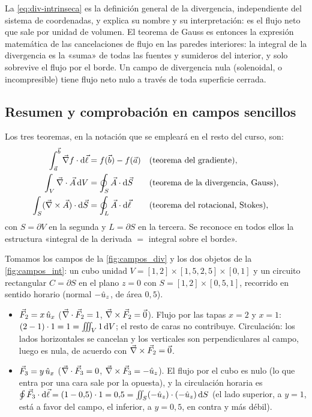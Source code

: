 La \cref{eq:div-intrinseca} es la definición general de la divergencia,
independiente del sistema de coordenadas, y explica su nombre y su
interpretación: es el flujo neto que sale por unidad de volumen. El teorema de
Gauss es entonces la expresión matemática de las cancelaciones de flujo en las
paredes interiores: la integral de la divergencia es la «suma» de todas las
fuentes y sumideros del interior, y solo sobrevive el flujo por el borde. Un
campo de divergencia nula (solenoidal, o incompresible) tiene flujo neto nulo a
través de toda superficie cerrada.



\subsection{Resumen y comprobación en campos sencillos}\label{sec:resumen-teoremas}
Los tres teoremas, en la notación que se empleará en el resto del curso, son:
\begin{align}
  \int_{\vec{a}}^{\vec{b}}\vec{\nabla} f\cdot\mathrm{d}\vec{\ell}&=f(\vec{b})-f(\vec{a}) &&\text{(teorema del gradiente)},\label{eq:resumen-grad}\\
  \int_{V}\vec{\nabla}\cdot\vec{A}\,\mathrm{d} V&=\oint_{S}\vec{A}\cdot\mathrm{d}\vec{S} &&\text{(teorema de la divergencia, Gauss)},\label{eq:resumen-gauss}\\
  \int_{S}(\vec{\nabla}\times\vec{A})\cdot\mathrm{d}\vec{S}&=\oint_{L}\vec{A}\cdot\mathrm{d}\vec{\ell} &&\text{(teorema del rotacional, Stokes)},\label{eq:resumen-stokes}
\end{align}
con $S=\partial V$ en la segunda y $L=\partial S$ en la tercera. Se reconoce en
todos ellos la estructura «integral de la derivada $=$ integral sobre el borde».

\begin{ejemplo}\label{ej:comprobacion-campos}
Tomamos los campos de la \cref{fig:campos_div} y los dos objetos de la
\cref{fig:campos_int}: un cubo unidad $V=[1,2]\times[1{,}5,2{,}5]\times[0,1]$ y un
circuito rectangular $C=\partial S$ en el plano $z=0$ con
$S=[1,2]\times[0{,}5,1]$, recorrido en sentido horario (normal $-\hat{u}_{z}$, de
área $0{,}5$).
\begin{itemize}
  \item $\vec{F}_2=x\,\hat{u}_{x}$ ($\vec{\nabla}\cdot\vec{F}_2=1$, $\vec{\nabla}\times\vec{F}_2=\vec{0}$).
        Flujo por las tapas $x=2$ y $x=1$: $(2-1)\cdot1=1=\iiint_V1\,\mathrm{d} V$;
        el resto de caras no contribuye. Circulación: los lados horizontales
        se cancelan y los verticales son perpendiculares al campo, luego es
        nula, de acuerdo con $\vec{\nabla}\times\vec{F}_2=\vec{0}$.
  \item $\vec{F}_3=y\,\hat{u}_{x}$ ($\vec{\nabla}\cdot\vec{F}_3=0$, $\vec{\nabla}\times\vec{F}_3=-\hat{u}_{z}$).
        El flujo por el cubo es nulo (lo que entra por una cara sale por la
        opuesta), y la circulación horaria es
        $\oint\vec{F}_3\cdot\mathrm{d}\vec{\ell}=(1-0{,}5)\cdot1=0{,}5=\iint_S(-\hat{u}_{z})\cdot(-\hat{u}_{z})\,\mathrm{d} S$
        (el lado superior, a $y=1$, está a favor del campo, el inferior, a
        $y=0{,}5$, en contra y más débil).
\end{itemize}
\end{ejemplo}


